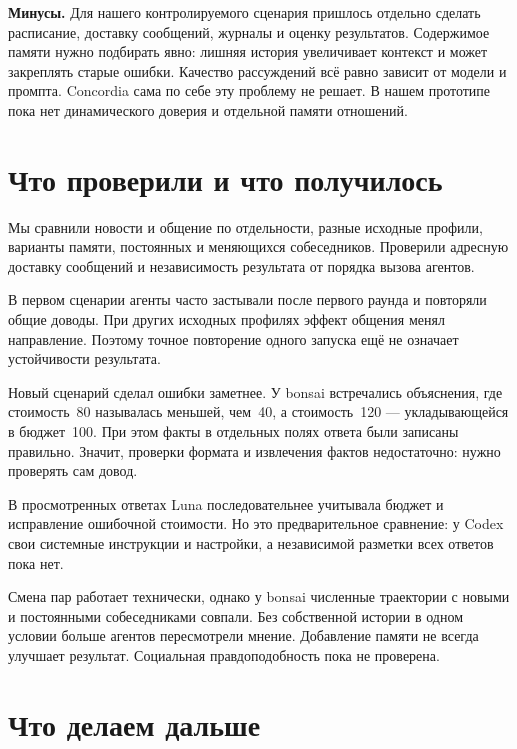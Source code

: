 \documentclass[12pt,a4paper]{article}
\begin{document}
\textbf{Минусы.} Для нашего контролируемого сценария пришлось отдельно
сделать расписание, доставку сообщений, журналы и оценку результатов.
Содержимое памяти нужно подбирать явно: лишняя история увеличивает
контекст и может закреплять старые ошибки. Качество рассуждений всё равно
зависит от модели и промпта. Concordia сама по себе эту проблему не решает.
В нашем прототипе пока нет динамического доверия и отдельной памяти отношений.

\section{Что проверили и что получилось}

Мы сравнили новости и общение по отдельности, разные исходные профили,
варианты памяти, постоянных и меняющихся собеседников. Проверили адресную
доставку сообщений и независимость результата от порядка вызова агентов.

В первом сценарии агенты часто застывали после первого раунда
и повторяли общие доводы. При других исходных профилях эффект общения
менял направление. Поэтому точное повторение одного запуска ещё
не означает устойчивости результата.

Новый сценарий сделал ошибки заметнее. У bonsai встречались объяснения,
где стоимость~80 называлась меньшей, чем~40, а стоимость~120 ---
укладывающейся в бюджет~100. При этом факты в отдельных полях ответа
были записаны правильно. Значит, проверки формата и извлечения фактов
недостаточно: нужно проверять сам довод.

В просмотренных ответах Luna последовательнее учитывала бюджет
и исправление ошибочной стоимости. Но это предварительное сравнение:
у Codex свои системные инструкции и настройки, а независимой разметки
всех ответов пока нет.

Смена пар работает технически, однако у bonsai численные траектории
с новыми и постоянными собеседниками совпали. Без собственной истории
в одном условии больше агентов пересмотрели мнение. Добавление памяти
не всегда улучшает результат. Социальная правдоподобность пока не проверена.

\section{Что делаем дальше}
\end{document}
